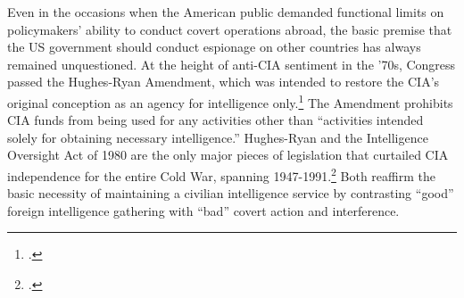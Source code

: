 \documentclass{memoir}
\begin{document}
\begin{refsegment}
Even in the occasions when the American public demanded functional limits on policymakers' ability to conduct covert operations abroad, the basic premise that the US government should conduct espionage on other countries has always remained unquestioned. At the height of anti-CIA sentiment in the '70s, Congress passed the Hughes-Ryan Amendment, which was intended to restore the CIA's original conception as an agency for intelligence only.\footcite[p.~215]{andrew_missing_1984} The Amendment prohibits CIA funds from being used for any activities other than ``activities intended solely for obtaining necessary intelligence.'' Hughes-Ryan and the Intelligence Oversight Act of 1980 are the only major pieces of legislation that curtailed CIA independence for the entire Cold War, spanning 1947-1991.\footcite[p.~93-94]{cogan_covert_1993} Both reaffirm the basic necessity of maintaining a civilian intelligence service by contrasting ``good'' foreign intelligence gathering with ``bad'' covert action and interference.




\end{refsegment}
\end{document}
